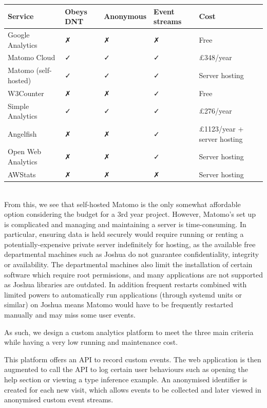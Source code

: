\documentclass[a4paper,fleqn,12pt]{article}
\begin{document}
\begin{adjustbox}{center}\begin{tabular}{ |l|l|l|l|l| }
  \hline
  \textbf{Service} & \textbf{Obeys DNT} & \textbf{Anonymous} & \textbf{Event streams} & \textbf{Cost} \\
  \hline
  Google Analytics & ✗ & ✗ & ✗ & Free \\
  \hline
  Matomo Cloud & ✓ & ✓ & ✓ & £348/year \\
  \hline
  Matomo (self-hosted) & ✓ & ✓ & ✓ & Server hosting \\
  \hline
  W3Counter & ✗ & ✗ & ✓ & Free \\
  \hline
  Simple Analytics & ✓ & ✓ & ✓ & £276/year \\
  \hline
  Angelfish & ✗ & ✗ & ✓ & £1123/year + server hosting \\
  \hline
  Open Web Analytics & ✗ & ✗ & ✓ & Server hosting \\
  \hline
  AWStats & ✗ & ✗ & ✗ & Server hosting \\
  \hline
\end{tabular}\end{adjustbox}\\

From this, we see that self-hosted Matomo is the only somewhat affordable option considering the budget for a 3rd year project. However, Matomo’s set up is complicated and managing and maintaining a server is time-consuming. In particular, ensuring data is held securely would require running or renting a potentially-expensive private server indefinitely for hosting, as the available free departmental machines such as Joshua do not guarantee confidentiality, integrity or availability. The departmental machines also limit the installation of certain software which require root permissions, and many applications are not supported as Joshua libraries are outdated. In addition frequent restarts combined with limited powers to automatically run applications (through systemd units or similar) on Joshua means Matomo would have to be frequently restarted manually and may miss some user events.

As such, we design a custom analytics platform to meet the three main criteria while having a very low running and maintenance cost.

This platform offers an API to record custom events. The web application is then augmented to call the API to log certain user behaviours such as opening the help section or viewing a type inference example. An anonymised identifier is created for each new visit, which allows events to be collected and later viewed in anonymised custom event streams.
\end{document}
